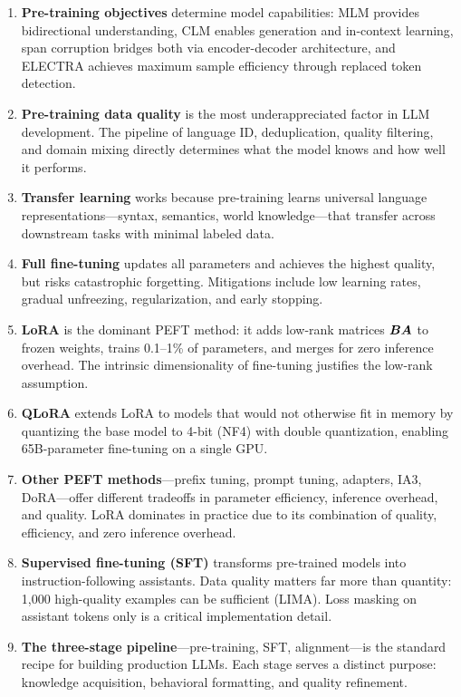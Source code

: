 \begin{enumerate}
    \item \textbf{Pre-training objectives} determine model capabilities:
          MLM provides bidirectional understanding, CLM enables generation and
          in-context learning, span corruption bridges both via encoder-decoder
          architecture, and ELECTRA achieves maximum sample efficiency through
          replaced token detection.

    \item \textbf{Pre-training data quality} is the most underappreciated
          factor in LLM development.  The pipeline of language ID, deduplication,
          quality filtering, and domain mixing directly determines what the model
          knows and how well it performs.

    \item \textbf{Transfer learning} works because pre-training learns
          universal language representations---syntax, semantics, world
          knowledge---that transfer across downstream tasks with minimal
          labeled data.

    \item \textbf{Full fine-tuning} updates all parameters and achieves the
          highest quality, but risks catastrophic forgetting.  Mitigations
          include low learning rates, gradual unfreezing, regularization, and
          early stopping.

    \item \textbf{LoRA} is the dominant PEFT method: it adds low-rank matrices
          $\bm{B}\bm{A}$ to frozen weights, trains 0.1--1\% of parameters, and merges
          for zero inference overhead.  The intrinsic dimensionality of
          fine-tuning justifies the low-rank assumption.

    \item \textbf{QLoRA} extends LoRA to models that would not otherwise fit
          in memory by quantizing the base model to 4-bit (NF4) with double
          quantization, enabling 65B-parameter fine-tuning on a single GPU.

    \item \textbf{Other PEFT methods}---prefix tuning, prompt tuning, adapters,
          IA3, DoRA---offer different tradeoffs in parameter efficiency,
          inference overhead, and quality.  LoRA dominates in practice due to
          its combination of quality, efficiency, and zero inference overhead.

    \item \textbf{Supervised fine-tuning (SFT)} transforms pre-trained models
          into instruction-following assistants.  Data quality matters far more
          than quantity: 1,000 high-quality examples can be sufficient (LIMA).
          Loss masking on assistant tokens only is a critical implementation
          detail.

    \item \textbf{The three-stage pipeline}---pre-training, SFT, alignment---is
          the standard recipe for building production LLMs.  Each stage serves a
          distinct purpose: knowledge acquisition, behavioral formatting, and
          quality refinement.
\end{enumerate}
